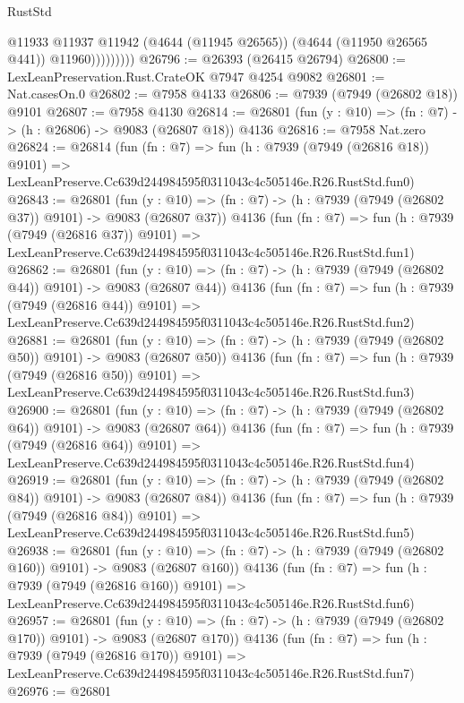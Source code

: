 \begin{lexlean}{RustStd}
\begin{coremodule}
                      @11933
                      @11937
                      @11942
                      (@4644 (@11945 @26565))
                      (@4644 (@11950 @26565 @441))
                      @11960)))))))))
@26796 := @26393 (@26415 @26794)
@26800 := LexLeanPreservation.Rust.CrateOK @7947 @4254 @9082
@26801 := Nat.casesOn.{0}
@26802 := @7958 @4133
@26806 := @7939 (@7949 (@26802 @18)) @9101
@26807 := @7958 @4130
@26814 := @26801 (fun (y : @10) => (fn : @7) -> (h : @26806) -> @9083 (@26807 @18)) @4136
@26816 := @7958 Nat.zero
@26824 := @26814
    (fun (fn : @7) =>
    fun (h : @7939 (@7949 (@26816 @18)) @9101) =>
    LexLeanPreserve.Cc639d244984595f0311043c4c505146e.R26.RustStd.fun0)
@26843 := @26801
    (fun (y : @10) => (fn : @7) -> (h : @7939 (@7949 (@26802 @37)) @9101) -> @9083 (@26807 @37))
    @4136
    (fun (fn : @7) =>
    fun (h : @7939 (@7949 (@26816 @37)) @9101) =>
    LexLeanPreserve.Cc639d244984595f0311043c4c505146e.R26.RustStd.fun1)
@26862 := @26801
    (fun (y : @10) => (fn : @7) -> (h : @7939 (@7949 (@26802 @44)) @9101) -> @9083 (@26807 @44))
    @4136
    (fun (fn : @7) =>
    fun (h : @7939 (@7949 (@26816 @44)) @9101) =>
    LexLeanPreserve.Cc639d244984595f0311043c4c505146e.R26.RustStd.fun2)
@26881 := @26801
    (fun (y : @10) => (fn : @7) -> (h : @7939 (@7949 (@26802 @50)) @9101) -> @9083 (@26807 @50))
    @4136
    (fun (fn : @7) =>
    fun (h : @7939 (@7949 (@26816 @50)) @9101) =>
    LexLeanPreserve.Cc639d244984595f0311043c4c505146e.R26.RustStd.fun3)
@26900 := @26801
    (fun (y : @10) => (fn : @7) -> (h : @7939 (@7949 (@26802 @64)) @9101) -> @9083 (@26807 @64))
    @4136
    (fun (fn : @7) =>
    fun (h : @7939 (@7949 (@26816 @64)) @9101) =>
    LexLeanPreserve.Cc639d244984595f0311043c4c505146e.R26.RustStd.fun4)
@26919 := @26801
    (fun (y : @10) => (fn : @7) -> (h : @7939 (@7949 (@26802 @84)) @9101) -> @9083 (@26807 @84))
    @4136
    (fun (fn : @7) =>
    fun (h : @7939 (@7949 (@26816 @84)) @9101) =>
    LexLeanPreserve.Cc639d244984595f0311043c4c505146e.R26.RustStd.fun5)
@26938 := @26801
    (fun (y : @10) => (fn : @7) -> (h : @7939 (@7949 (@26802 @160)) @9101) -> @9083 (@26807 @160))
    @4136
    (fun (fn : @7) =>
    fun (h : @7939 (@7949 (@26816 @160)) @9101) =>
    LexLeanPreserve.Cc639d244984595f0311043c4c505146e.R26.RustStd.fun6)
@26957 := @26801
    (fun (y : @10) => (fn : @7) -> (h : @7939 (@7949 (@26802 @170)) @9101) -> @9083 (@26807 @170))
    @4136
    (fun (fn : @7) =>
    fun (h : @7939 (@7949 (@26816 @170)) @9101) =>
    LexLeanPreserve.Cc639d244984595f0311043c4c505146e.R26.RustStd.fun7)
@26976 := @26801

\end{coremodule}
\end{lexlean}
